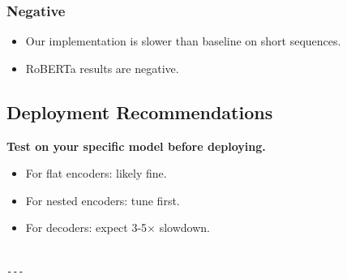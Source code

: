 \subsubsection{Negative}

\begin{itemize}
\item Our implementation is slower than baseline on short sequences.
\item RoBERTa results are negative.

\end{itemize}
\subsection{Deployment Recommendations}

\textbf{Test on your specific model before deploying.}
\begin{itemize}
\item For flat encoders: likely fine.
\item For nested encoders: tune first.
\item For decoders: expect 3-5$\times$ slowdown.
\end{itemize}
\begin{lstlisting}

---
\end{lstlisting}